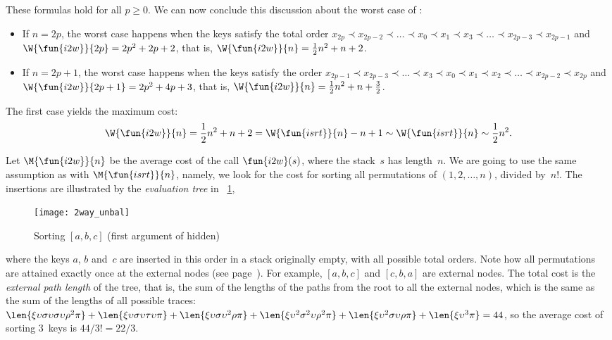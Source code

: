 These formulas hold for all \(p \geqslant 0\). We can now conclude
this discussion about the worst case of :
\begin{itemize}

\item If \(n = 2p\), the worst case happens when the keys satisfy the
  total order \(x_{2p} \prec x_{2p-2} \prec \dots \prec x_0 \prec x_1
  \prec x_3 \prec \dots \prec x_{2p-3} \prec x_{2p-1}\) and
  \(\W{\fun{i2w}}{2p} = 2p^2 + 2p + 2\), that is, \(\W{\fun{i2w}}{n} =
  \frac{1}{2}{n^2} + n + 2\).

\item If \(n = 2p+1\), the worst case happens when the keys satisfy
  the order \(x_{2p-1} \prec x_{2p-3} \prec \dots \prec x_3 \prec x_0
  \prec x_1 \prec x_2 \prec \dots \prec x_{2p-2} \prec x_{2p}\) and
  \(\W{\fun{i2w}}{2p+1} = 2p^2 + 4p + 3\), that is, \(\W{\fun{i2w}}{n}
  = \frac{1}{2}{n^2} + n + \frac{3}{2}\).

\end{itemize}
The first case yields the maximum cost:
\begin{equation*}
\belowdisplayskip=0pt
  \W{\fun{i2w}}{n} = \frac{1}{2}{n^2} + n + 2 = \W{\fun{isrt}}{n} - n
  + 1 \sim
  \W{\fun{isrt}}{n} \sim \frac{1}{2}{n^2}.
\end{equation*}



Let \(\M{\fun{i2w}}{n}\) be the average
cost of the call \(\fun{i2w}(s)\), where the
stack~\(s\) has length~\(n\). We are going to use the same assumption
as with \(\M{\fun{isrt}}{n}\), namely, we look for the cost for
sorting all permutations of \((1,2,\dots,n)\), divided by~\(n!\). The
insertions are illustrated by the \emph{evaluation
  tree} in \fig~\ref{fig:2way_unbal},
\begin{figure}[t]
\centering
\texttt{[image: 2way\_unbal]}
\caption{Sorting \([a,b,c]\) (first argument of  hidden)}
\label{fig:2way_unbal}
\end{figure}
where the keys \(a\), \(b\) and~\(c\) are inserted in this order in a
stack originally empty, with all possible total orders. Note how all
permutations are attained exactly once at the external
nodes (see
page~\pageref{def:external_node}). For example, \([a,b,c]\) and
\([c,b,a]\) are external nodes. The total cost is the \emph{external
  path length}\label{external_path_length} of the tree, that is, the sum of
the lengths of the paths from the root to all the external nodes,
which is the same as the sum of the lengths of all possible
traces:
\(\len{\xi\upsilon\sigma\upsilon\sigma\upsilon\rho^2\pi} +
\len{\xi\upsilon\sigma\upsilon\tau\upsilon\pi} +
\len{\xi\upsilon\sigma\upsilon^2\rho\pi} +
\len{\xi\upsilon^2\sigma^2\upsilon\rho^2\pi} +
\len{\xi\upsilon^2\sigma\upsilon\rho\pi} + \len{\xi\upsilon^3\pi} =
44\), so the average cost of sorting \(3\)~keys is \(44/3! = 22/3\).

